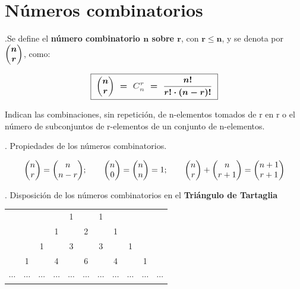 \vspace{2cm} %
\section{Números combinatorios}\label{tartaglia}

\begin{definition}
	.Se define el \textbf{número combinatorio $\boldsymbol{n}$ sobre $\boldsymbol{r}$}, con $\boldsymbol{r\le n}$, y se denota por $\boldsymbol{\mqty(n\\r)}$, como:
	
	\vspace{2mm} $$\boxed{\ \boldsymbol{ \mqty(n\\r) \ = \ \textcolor{gris}{C_n^r} \ = \ \dfrac {n!}{r! \cdot (n-r)!} }	 \ }$$
	
	\vspace{2mm} Indican las combinaciones, sin repetición, de n-elementos tomados de r en r o el número de subconjuntos de r-elementos de un conjunto de n-elementos.
\end{definition}

\begin{theorem}
	. Propiedades de los números combinatorios.
	
	\begin{small}
	$$\mqty(n\\r)=\mqty(n\\n-r); \qquad \mqty(n\\0)=\mqty(n\\n)=1; \qquad \mqty(n\\r)+\mqty(n\\r+1)=\mqty(n+1\\r+1)$$
	\end{small}	
\end{theorem}


\begin{example}
	. Disposición de los números combinatorios en el \textbf{Triángulo de Tartaglia}	
	
	\begin{table}[H]
	\centering
	\begin{tabular}{ccccccccccc}
        	 &          &          &          & 1        &          & 1        	&          &          &          &          \\
         	&          &          & 1        &          & 2        &          	& 1        &          &          &          \\
         	&          & 1        &          & 3        &          & 3        	&          & 1        &          &          \\
        	 & 1        &          & 4        &          & 6        &          	& 4        &          & 1        &          \\
		$\cdots$ & $\cdots$ & $\cdots$ & $\cdots$ & $\cdots$ & $\cdots$ & $\cdots$ & $\cdots$ & $\cdots$ & $\cdots$ & $\cdots$
	\end{tabular}
\end{table}
\end{example}

